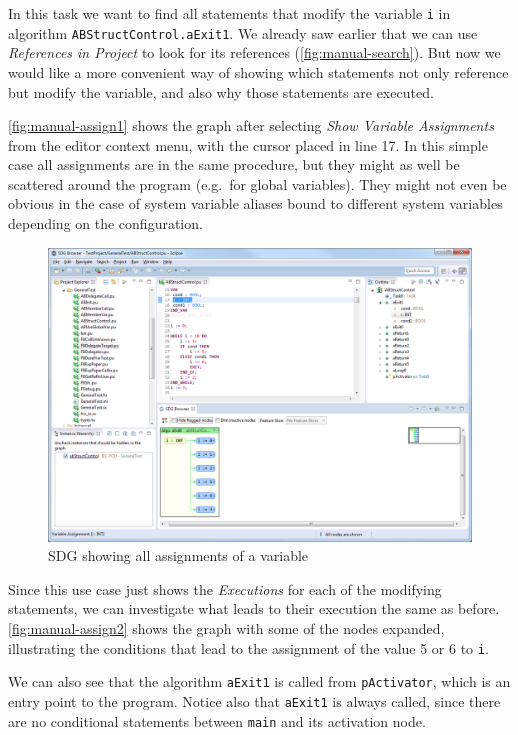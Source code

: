 In this task we want to find all statements that modify the variable \lstinline|i| in algorithm 
\lstinline|ABStructControl.aExit1|. We already saw earlier that we can use \emph{References in Project} to look for its 
references (\autoref{fig:manual-search}). But now we would like a more convenient way of showing which statements not 
only reference but modify the variable, and also why those statements are executed.

\autoref{fig:manual-assign1} shows the graph after selecting \emph{Show Variable Assignments} from the editor context 
menu, with the cursor placed in line 17. In this simple case all assignments are in the same procedure, but they might 
as well be scattered around the program (e.g.\ for global variables). They might not even be obvious in the case of 
system variable aliases bound to different system variables depending on the configuration.

\begin{figure}[hpb]
  \centering
    \includegraphics[width=\textwidth]{bilder/manual-assign1}
  \caption{SDG showing all assignments of a variable}
  \label{fig:manual-assign1}
\end{figure}

Since this use case just shows the \emph{Executions} for each of the modifying statements, we can investigate what 
leads to their execution the same as before. \autoref{fig:manual-assign2} shows the graph with some of the nodes 
expanded, illustrating the conditions that lead to the assignment of the value 5 or 6 to \lstinline|i|.

We can also see that the algorithm \lstinline|aExit1| is called from \lstinline|pActivator|, which is an entry point to 
the program. Notice also that \lstinline|aExit1| is always called, since there are no conditional statements between 
\lstinline|main| and its activation node.

